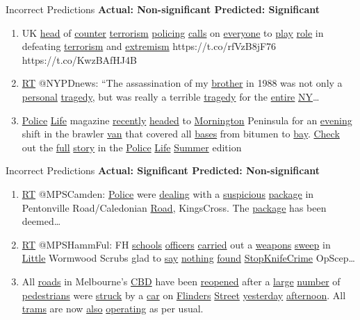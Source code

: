 \documentclass[12pt]{beamer}
\begin{document}
\begin{frame}{Incorrect Predictions}
    \textbf{Actual: Non-significant \hfill Predicted: Significant}
    \begin{enumerate}
        \item UK \underline{head} of \underline{counter} \underline{terrorism} \underline{policing} \underline{calls} on \underline{everyone} to \underline{play} \underline{role} in defeating \underline{terrorism} and \underline{extremism} https://t.co/rfVzB8jF76 https://t.co/KwzBAfHJ4B
        \item \underline{RT} @NYPDnews: “The assassination of my \underline{brother} in 1988 was not only a \underline{personal} \underline{tragedy}, but was really a terrible \underline{tragedy} for the \underline{entire} \underline{NY}…
        \item \underline{Police} \underline{Life} magazine \underline{recently} \underline{headed} to \underline{Mornington} Peninsula for an \underline{evening} shift in the brawler \underline{van} that covered all \underline{bases} from bitumen to \underline{bay}. \underline{Check} out the \underline{full} \underline{story} in the \underline{Police} \underline{Life} \underline{Summer} edition
    \end{enumerate}
\end{frame}

\begin{frame}{Incorrect Predictions}
    \textbf{Actual: Significant \hfill Predicted: Non-significant}
    \begin{enumerate}
        \item \underline{RT} @MPSCamden: \underline{Police} were \underline{dealing} with a \underline{suspicious} \underline{package} in Pentonville Road/Caledonian \underline{Road}, KingsCross. The \underline{package} has been deemed…
        \item \underline{RT} @MPSHammFul: FH \underline{schools} \underline{officers} \underline{carried} out a \underline{weapons} \underline{sweep} in \underline{Little} Wormwood Scrubs glad to \underline{say} \underline{nothing} \underline{found} \underline{StopKnifeCrime} OpScep…
        \item All \underline{roads} in Melbourne's \underline{CBD} have been \underline{reopened} after a \underline{large} \underline{number} of \underline{pedestrians} were \underline{struck} by a \underline{car} on \underline{Flinders} \underline{Street} \underline{yesterday} \underline{afternoon}. All \underline{trams} are now \underline{also} \underline{operating} as per usual.
    \end{enumerate}
\end{frame}
\end{document}
